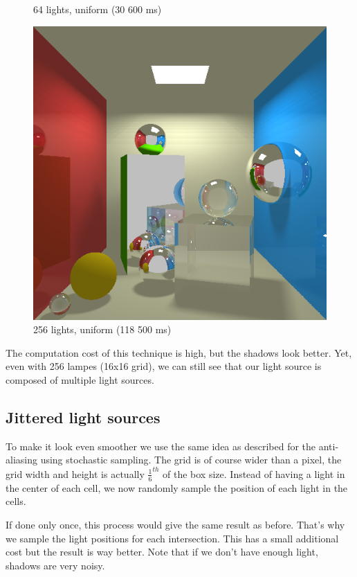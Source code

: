 \begin{figure}[H]
    \caption{64 lights, uniform (30 600 ms)}
\endminipage\hfill
{}
    \centering
    \includegraphics[width=\linewidth]{img/shadows/256.png}
    \caption{256 lights, uniform (118 500 ms)}
\endminipage\hfill
\end{figure}

The computation cost of this technique is high, but the shadows look better. Yet, even with 256 lampes (16x16 grid), we can still see that our light source is composed of multiple light sources.


\subsection{Jittered light sources}
To make it look even smoother we use the same idea as described for the anti-aliasing using stochastic sampling. The grid is of course wider than a pixel, the grid width and height is actually $\frac{1}{6}^{th}$ of the box size. Instead of having a light in the center of each cell, we now randomly sample the position of each light in the cells.

If done only once, this process would give the same result as before. That's why we sample the light positions for each intersection. This has a small additional cost but the result is way better. Note that if we don't have enough light, shadows are very noisy.

